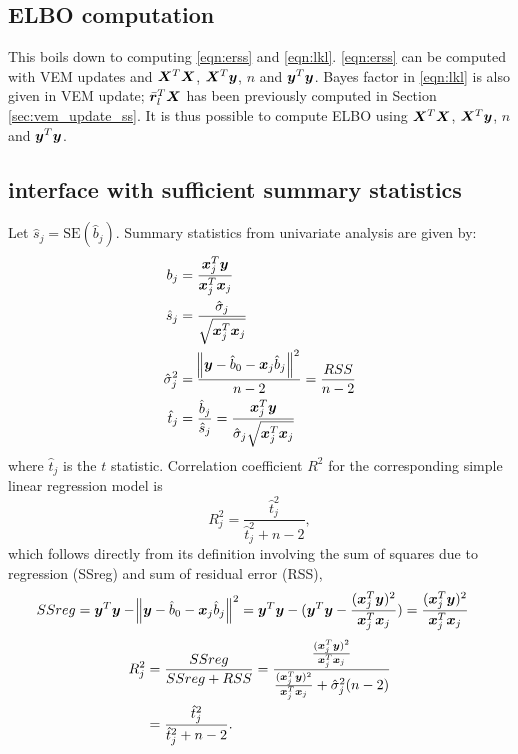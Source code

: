 \subsection{ELBO computation} \label{sec:elbo_ss}
This boils down to computing \eqref{eqn:erss} and \eqref{eqn:lkl}. \eqref{eqn:erss} can be computed with VEM updates and $\bm X^T\bm X$, $\bm X^T\bm y$, $n$ and $\bm y^T\bm y$. Bayes factor in \eqref{eqn:lkl} is also given in VEM update; $\bar{\bm r}_l^T\bm X$ has been previously computed in Section \ref{sec:vem_update_ss}. It is thus possible to compute ELBO using $\bm X^T\bm X$, $\bm X^T\bm y$, $n$ and $\bm y^T\bm y$.

\subsection{\susie interface with sufficient summary statistics}
Let $\hat{s}_j = \text{SE}(\hat{b}_j)$. Summary statistics from univariate analysis are given by:
\begin{align}
    b_{j} &= \frac{\bm x_{j}^{T}\bm y}{\bm x_{j}^{T}\bm x_{j}} \\
    \hat{s}_{j} &= \frac{\hat{\sigma}_{j}}{\sqrt{\bm x_{j}^{T}\bm x_{j}}} \\ \label{eqn:shat}
    \hat{\sigma}_{j}^{2} &= \frac{\norm{\bm y - \hat{b}_0 - \bm x_{j} \hat{b}_{j}}^2}{n-2} = \frac{RSS}{n-2} \\
    \hat{t}_{j} &= \frac{\hat{b}_{j}}{\hat{s}_{j}} = \frac{\bm x_{j}^{T}\bm y}{\hat{\sigma}_{j}\sqrt{\bm x_{j}^{T}\bm x_{j}}}
\end{align}
where $\hat{t}_j$ is the $t$ statistic. Correlation coefficient $R^2$ for the corresponding simple linear regression model is
\begin{equation}
    R_{j}^2 = \frac{\hat{t}_{j}^2}{\hat{t}_{j}^2+n-2},
\end{equation}
which follows directly from its definition involving the sum of squares due to regression (SSreg) and sum of residual error (RSS), 
\begin{align}
    SSreg &= \bm y^T \bm y - \norm{\bm y - \hat{b}_0 - \bm x_{j} \hat{b}_{j}}^2 = \bm y^T \bm y - (\bm y^T \bm y - \frac{(\bm x_{j}^{T}\bm y)^2}{\bm x_{j}^{T}\bm x_{j}}) = \frac{(\bm x_{j}^{T}\bm y)^2}{\bm x_{j}^{T}\bm x_{j}}
\end{align}
\begin{align}
    R_{j}^2 &= \frac{SSreg}{SSreg + RSS} = \frac{\frac{(\bm x_{j}^{T}\bm y)^2}{\bm x_{j}^{T}\bm x_{j}}}{\frac{(\bm x_{j}^{T}\bm y)^2}{\bm x_{j}^{T}\bm x_{j}} + \hat{\sigma}_{j}^{2}(n-2)} \\
    &= \frac{\hat{t}_{j}^2}{\hat{t}_{j}^2+n-2}.
\end{align}
